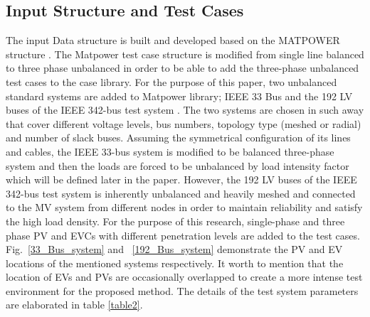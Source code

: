 \documentclass[journal]{IEEEtran}
\begin{document}
\subsection {Input Structure and Test Cases}
The input Data structure is built and developed based on the MATPOWER structure \cite{zimmerman2010matpower}. The Matpower test case structure is modified from single line balanced to three phase unbalanced in order to be able to add the three-phase unbalanced test cases to the case library. For the purpose of this paper, two unbalanced standard systems are added to Matpower library; IEEE 33 Bus \cite{baran1989network} and the 192 LV buses of the IEEE 342-bus test system \cite{schneider2014ieee}. The two systems are chosen in such away that cover different voltage levels, bus numbers, topology type (meshed  or radial) and number of slack buses. Assuming the symmetrical configuration of its lines and cables, the IEEE 33-bus system is modified to be balanced three-phase system and then the loads are forced to be unbalanced by load intensity factor which will be defined later in the paper. However, the 192 LV buses of the IEEE 342-bus test system is inherently unbalanced and heavily meshed and connected to the MV system from different nodes in order to maintain reliability and satisfy the high load density. For the purpose of this research, single-phase and three phase PV and EVCs with different penetration levels are added to the test cases. Fig.~\ref{33_Bus_system} and ~\ref{192_Bus_system} demonstrate the  PV and EV locations of the mentioned systems respectively. It worth to mention that the location of EVs and PVs are occasionally overlapped to create a more intense test environment for the proposed method. The details of the test system parameters are elaborated in table \ref{table2}.
\end{document}
